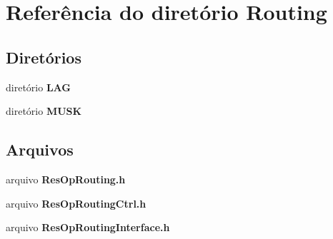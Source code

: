 \section{Referência do diretório Routing}
\label{dir_2ef7c376af5f45ab84771ab6dac2a5c0}
\subsection*{Diretórios}
\begin{DoxyCompactItemize}
\item 
diretório {\bf L\+AG}
\item 
diretório {\bf M\+U\+SK}
\end{DoxyCompactItemize}
\subsection*{Arquivos}
\begin{DoxyCompactItemize}
\item 
arquivo {\bf Res\+Op\+Routing.\+h}
\item 
arquivo {\bf Res\+Op\+Routing\+Ctrl.\+h}
\item 
arquivo {\bf Res\+Op\+Routing\+Interface.\+h}
\end{DoxyCompactItemize}
